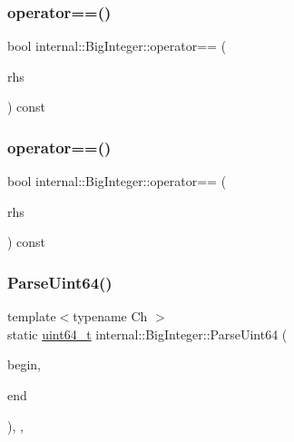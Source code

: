 \mbox{\label{classinternal_1_1BigInteger_a52b424669238bdebc134e793d3b470ae}} 
\subsubsection{\texorpdfstring{operator==()}{operator==()}\hspace{0.1cm}{\footnotesize\ttfamily [1/2]}}
{\footnotesize\ttfamily bool internal\+::\+Big\+Integer\+::operator== (\begin{DoxyParamCaption}\item[{const \hyperlink{classinternal_1_1BigInteger}{Big\+Integer} \&}]{rhs }\end{DoxyParamCaption}) const\hspace{0.3cm}{\ttfamily [inline]}}

\mbox{\label{classinternal_1_1BigInteger_a8b6ab0d652d461c1136e0388d352628b}} 
\subsubsection{\texorpdfstring{operator==()}{operator==()}\hspace{0.1cm}{\footnotesize\ttfamily [2/2]}}
{\footnotesize\ttfamily bool internal\+::\+Big\+Integer\+::operator== (\begin{DoxyParamCaption}\item[{const \hyperlink{classinternal_1_1BigInteger_a1310812fca26ebae77594ba08678fc4c}{Type}}]{rhs }\end{DoxyParamCaption}) const\hspace{0.3cm}{\ttfamily [inline]}}

\mbox{\label{classinternal_1_1BigInteger_acebb94526a2f5f26f0de244b7f76a3db}} 
\subsubsection{\texorpdfstring{Parse\+Uint64()}{ParseUint64()}}
{\footnotesize\ttfamily template$<$typename Ch $>$ \\
static \hyperlink{stdint_8h_aec6fcb673ff035718c238c8c9d544c47}{uint64\+\_\+t} internal\+::\+Big\+Integer\+::\+Parse\+Uint64 (\begin{DoxyParamCaption}\item[{const Ch $\ast$}]{begin,  }\item[{const Ch $\ast$}]{end }\end{DoxyParamCaption})\hspace{0.3cm}{\ttfamily [inline]}, {\ttfamily [static]}, {\ttfamily [private]}}

